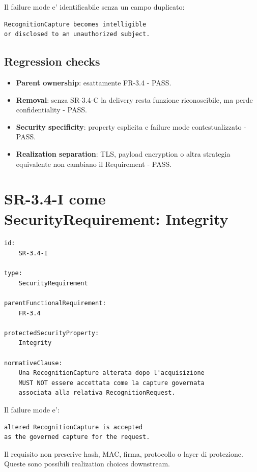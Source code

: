\documentclass[11pt,a4paper]{article}
\begin{document}
Il failure mode e' identificabile senza un campo duplicato:

\begin{lstlisting}
RecognitionCapture becomes intelligible
or disclosed to an unauthorized subject.
\end{lstlisting}

\subsection{Regression checks}

\begin{itemize}
  \item \textbf{Parent ownership}: esattamente FR-3.4 - PASS.
  \item \textbf{Removal}: senza SR-3.4-C la delivery resta funzione riconoscibile, ma perde confidentiality - PASS.
  \item \textbf{Security specificity}: property esplicita e failure mode contestualizzato - PASS.
  \item \textbf{Realization separation}: TLS, payload encryption o altra strategia equivalente non cambiano il Requirement - PASS.
\end{itemize}

\section{SR-3.4-I come SecurityRequirement: Integrity}

\begin{lstlisting}
id:
    SR-3.4-I

type:
    SecurityRequirement

parentFunctionalRequirement:
    FR-3.4

protectedSecurityProperty:
    Integrity

normativeClause:
    Una RecognitionCapture alterata dopo l'acquisizione
    MUST NOT essere accettata come la capture governata
    associata alla relativa RecognitionRequest.
\end{lstlisting}

Il failure mode e':

\begin{lstlisting}
altered RecognitionCapture is accepted
as the governed capture for the request.
\end{lstlisting}

Il requisito non prescrive hash, MAC, firma, protocollo o layer di protezione. Queste sono possibili realization choices downstream.
\end{document}
